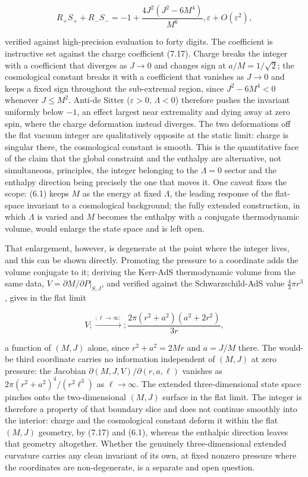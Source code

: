 \documentclass[11pt]{article}
\begin{document}
\begin{equation*}
R_+S_+ + R_-S_- = -1 + \frac{4J^2(J^2 - 6M^4)}{M^6},\varepsilon + O(\varepsilon^2),
\tag{6.1}
\end{equation*}

verified against high-precision evaluation to forty digits. The coefficient is instructive set against the charge coefficient (7.17). Charge breaks the integer with a coefficient that diverges as $J \to 0$ and changes sign at $a/M = 1/\sqrt2$; the cosmological constant breaks it with a coefficient that vanishes as $J \to 0$ and keeps a fixed sign throughout the sub-extremal region, since $J^2 - 6M^4 < 0$ whenever $J \le M^2$. Anti-de Sitter ($\varepsilon > 0$, $\Lambda < 0$) therefore pushes the invariant uniformly below $-1$, an effect largest near extremality and dying away at zero spin, where the charge deformation instead diverges. The two deformations off the flat vacuum integer are qualitatively opposite at the static limit: charge is singular there, the cosmological constant is smooth. This is the quantitative face of the claim that the global constraint and the enthalpy are alternative, not simultaneous, principles, the integer belonging to the $\Lambda = 0$ sector and the enthalpy direction being precisely the one that moves it. One caveat fixes the scope: (6.1) keeps $M$ as the energy at fixed $\Lambda$, the leading response of the flat-space invariant to a cosmological background; the fully extended construction, in which $\Lambda$ is varied and $M$ becomes the enthalpy with a conjugate thermodynamic volume, would enlarge the state space and is left open.

That enlargement, however, is degenerate at the point where the integer lives, and this can be shown directly. Promoting the pressure to a coordinate adds the volume conjugate to it; deriving the Kerr-AdS thermodynamic volume from the same data, $V = \partial M / \partial P|_{S,J}$, and verified against the Schwarzschild-AdS value $\tfrac{4}{3}\pi r^3$, gives in the flat limit

\begin{equation*}
V ;\xrightarrow{;\ell \to \infty;}; \frac{2\pi(r^2+a^2)(a^2+2r^2)}{3r},
\tag{6.2}
\end{equation*}

a function of $(M,J)$ alone, since $r^2 + a^2 = 2Mr$ and $a = J/M$ there. The would-be third coordinate carries no information independent of $(M,J)$ at zero pressure: the Jacobian $\partial(M,J,V)/\partial(r,a,\ell)$ vanishes as $2\pi(r^2+a^2)^4/(r^2\ell^3)$ as $\ell \to \infty$. The extended three-dimensional state space pinches onto the two-dimensional $(M,J)$ surface in the flat limit. The integer is therefore a property of that boundary slice and does not continue smoothly into the interior: charge and the cosmological constant deform it within the flat $(M,J)$ geometry, by (7.17) and (6.1), whereas the enthalpic direction leaves that geometry altogether. Whether the genuinely three-dimensional extended curvature carries any clean invariant of its own, at fixed nonzero pressure where the coordinates are non-degenerate, is a separate and open question.
\end{document}
